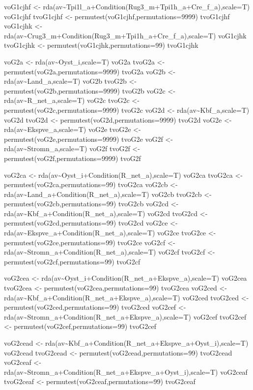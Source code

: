 \documentclass[]{article}
\begin{document}
voG1cjhf \textless{}-
rda(av\textasciitilde{}Tpi1l\_a+Condition(Rug3\_m+Tpi1h\_a+Cre\_f\_a),scale=T)
voG1cjhf tvoG1cjhf \textless{}- permutest(voG1cjhf,permutations=9999)
tvoG1cjhf voG1cjhk \textless{}-
rda(av\textasciitilde{}Crug3\_m+Condition(Rug3\_m+Tpi1h\_a+Cre\_f\_a),scale=T)
voG1cjhk tvoG1cjhk \textless{}- permutest(voG1cjhk,permutations=99)
tvoG1cjhk

voG2a \textless{}- rda(av\textasciitilde{}Oyst\_i,scale=T) voG2a tvoG2a
\textless{}- permutest(voG2a,permutations=9999) tvoG2a voG2b
\textless{}- rda(av\textasciitilde{}Land\_a,scale=T) voG2b tvoG2b
\textless{}- permutest(voG2b,permutations=9999) tvoG2b voG2c
\textless{}- rda(av\textasciitilde{}R\_net\_a,scale=T) voG2c tvoG2c
\textless{}- permutest(voG2c,permutations=9999) tvoG2c voG2d
\textless{}- rda(av\textasciitilde{}Kbf\_a,scale=T) voG2d tvoG2d
\textless{}- permutest(voG2d,permutations=9999) tvoG2d voG2e
\textless{}- rda(av\textasciitilde{}Ekspve\_a,scale=T) voG2e tvoG2e
\textless{}- permutest(voG2e,permutations=9999) tvoG2e voG2f
\textless{}- rda(av\textasciitilde{}Stromn\_a,scale=T) voG2f tvoG2f
\textless{}- permutest(voG2f,permutations=9999) tvoG2f

voG2ca \textless{}-
rda(av\textasciitilde{}Oyst\_i+Condition(R\_net\_a),scale=T) voG2ca
tvoG2ca \textless{}- permutest(voG2ca,permutations=99) tvoG2ca voG2cb
\textless{}-
rda(av\textasciitilde{}Land\_a+Condition(R\_net\_a),scale=T) voG2cb
tvoG2cb \textless{}- permutest(voG2cb,permutations=99) tvoG2cb voG2cd
\textless{}- rda(av\textasciitilde{}Kbf\_a+Condition(R\_net\_a),scale=T)
voG2cd tvoG2cd \textless{}- permutest(voG2cd,permutations=99) tvoG2cd
voG2ce \textless{}-
rda(av\textasciitilde{}Ekspve\_a+Condition(R\_net\_a),scale=T) voG2ce
tvoG2ce \textless{}- permutest(voG2ce,permutations=99) tvoG2ce voG2cf
\textless{}-
rda(av\textasciitilde{}Stromn\_a+Condition(R\_net\_a),scale=T) voG2cf
tvoG2cf \textless{}- permutest(voG2cf,permutations=99) tvoG2cf

voG2cea \textless{}-
rda(av\textasciitilde{}Oyst\_i+Condition(R\_net\_a+Ekspve\_a),scale=T)
voG2cea tvoG2cea \textless{}- permutest(voG2cea,permutations=99)
tvoG2cea voG2ced \textless{}-
rda(av\textasciitilde{}Kbf\_a+Condition(R\_net\_a+Ekspve\_a),scale=T)
voG2ced tvoG2ced \textless{}- permutest(voG2ced,permutations=99)
tvoG2ced voG2cef \textless{}-
rda(av\textasciitilde{}Stromn\_a+Condition(R\_net\_a+Ekspve\_a),scale=T)
voG2cef tvoG2cef \textless{}- permutest(voG2cef,permutations=99)
tvoG2cef

voG2cead \textless{}-
rda(av\textasciitilde{}Kbf\_a+Condition(R\_net\_a+Ekspve\_a+Oyst\_i),scale=T)
voG2cead tvoG2cead \textless{}- permutest(voG2cead,permutations=99)
tvoG2cead voG2ceaf \textless{}-
rda(av\textasciitilde{}Stromn\_a+Condition(R\_net\_a+Ekspve\_a+Oyst\_i),scale=T)
voG2ceaf tvoG2ceaf \textless{}- permutest(voG2ceaf,permutations=99)
tvoG2ceaf
\end{document}
